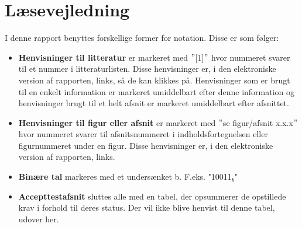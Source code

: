 \section*{Læsevejledning}
I denne rapport benyttes forskellige former for notation. Disse er som følger:

\begin{itemize}
\item \textbf{Henvisninger til litteratur} er markeret med $"$[1]$"$ hvor nummeret svarer til et nummer i litteraturlisten. Disse henvisninger er, i den elektroniske version af rapporten, links, så de kan klikkes på. Henvisninger som er brugt til en enkelt information er markeret umiddelbart efter denne information og henvisninger brugt til et helt afsnit er markeret umiddelbart efter afsnittet.

\item \textbf{Henvisninger til figur eller afsnit} er markeret med $"$se figur/afsnit x.x.x$"$ hvor nummeret svarer til afsnitsnummeret i indholdsfortegnelsen eller figurnummeret under en figur. Disse henvisninger er, i den elektroniske version af rapporten, links.

\item \textbf{Binære tal} markeres med et undersænket b. F.eks. "10011$_b$" 

\item \textbf{Accepttestafsnit} sluttes alle med en tabel, der opsummerer de opstillede krav i forhold til deres status. Der vil ikke blive henvist til denne tabel, udover her. 
\end{itemize}